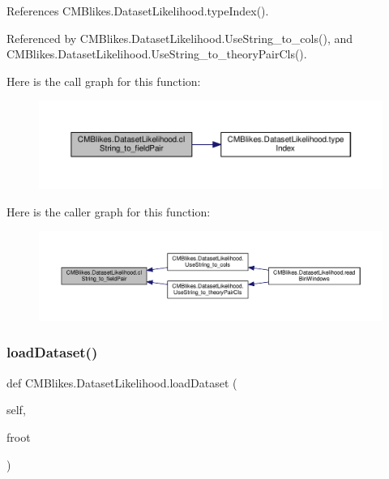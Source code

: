 References C\+M\+Blikes.\+Dataset\+Likelihood.\+type\+Index().



Referenced by C\+M\+Blikes.\+Dataset\+Likelihood.\+Use\+String\+\_\+to\+\_\+cols(), and C\+M\+Blikes.\+Dataset\+Likelihood.\+Use\+String\+\_\+to\+\_\+theory\+Pair\+Cls().

Here is the call graph for this function\+:
\nopagebreak
\begin{figure}[H]
\begin{center}
\leavevmode
\includegraphics[width=350pt]{classCMBlikes_1_1DatasetLikelihood_a1c4319df1f3bee812339356d08d11266_cgraph}
\end{center}
\end{figure}
Here is the caller graph for this function\+:
\nopagebreak
\begin{figure}[H]
\begin{center}
\leavevmode
\includegraphics[width=350pt]{classCMBlikes_1_1DatasetLikelihood_a1c4319df1f3bee812339356d08d11266_icgraph}
\end{center}
\end{figure}
\mbox{\label{classCMBlikes_1_1DatasetLikelihood_a937aff0ad89355d32c9d5fe9bda150f8}} 
\subsubsection{\texorpdfstring{load\+Dataset()}{loadDataset()}}
{\footnotesize\ttfamily def C\+M\+Blikes.\+Dataset\+Likelihood.\+load\+Dataset (\begin{DoxyParamCaption}\item[{}]{self,  }\item[{}]{froot }\end{DoxyParamCaption})}



